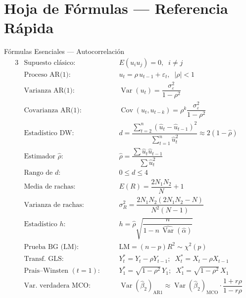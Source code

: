 \documentclass[11pt, letterpaper]{article}
\begin{document}
\newpage

\section*{Hoja de F\'ormulas --- Referencia R\'apida}

\begin{formulabox}{F\'ormulas Esenciales --- Autocorrelaci\'on}
\begin{alignat}{3}
  &\text{Supuesto cl\'asico:}    &\quad&
    E(u_i u_j) = 0,\;\; i\neq j \tag{A1}\\[3pt]
  &\text{Proceso AR(1):}       &\quad&
    u_t = \rho\, u_{t-1} + \varepsilon_t,\;\; |\rho|<1 \tag{A2}\\[3pt]
  &\text{Varianza AR(1):}      &\quad&
    \operatorname{Var}(u_t) = \dfrac{\sigma_\varepsilon^2}{1-\rho^2} \tag{A3}\\[5pt]
  &\text{Covarianza AR(1):}    &\quad&
    \operatorname{Cov}(u_t,u_{t-k}) = \rho^k\dfrac{\sigma_\varepsilon^2}{1-\rho^2} \tag{A4}\\[5pt]
  &\text{Estad\'istico DW:}      &\quad&
    d = \dfrac{\sum_{t=2}^n(\hat u_t-\hat u_{t-1})^2}{\sum_{t=1}^n\hat u_t^2}
      \approx 2(1-\hat\rho) \tag{A5}\\[5pt]
  &\text{Estimador }\hat\rho: &\quad&
    \hat\rho = \dfrac{\sum \hat u_t\hat u_{t-1}}{\sum\hat u_t^2} \tag{A6}\\[5pt]
  &\text{Rango de }d: &\quad&
    0 \leq d \leq 4 \tag{A7}\\[3pt]
  &\text{Media de rachas:}     &\quad&
    E(R) = \dfrac{2N_1 N_2}{N}+1 \tag{A8}\\[5pt]
  &\text{Varianza de rachas:}  &\quad&
    \sigma_R^2 = \dfrac{2N_1 N_2(2N_1 N_2 - N)}{N^2(N-1)} \tag{A9}\\[5pt]
  &\text{Estad\'istico }h: &\quad&
    h = \hat\rho\sqrt{\dfrac{n}{1-n\,\widehat{\operatorname{Var}}(\hat\alpha)}} \tag{A10}\\[5pt]
  &\text{Prueba BG (LM):}      &\quad&
    \mathrm{LM} = (n-p)R^2 \sim \chi^2(p) \tag{A11}\\[3pt]
  &\text{Transf.\ GLS:}  &\quad&
    Y_t^* = Y_t - \rho Y_{t-1};\;\; X_t^* = X_t - \rho X_{t-1} \tag{A12}\\[3pt]
  &\text{Prais--Winsten }(t=1): &\quad&
    Y_1^* = \sqrt{1-\rho^2}\,Y_1;\;\; X_1^* = \sqrt{1-\rho^2}\,X_1 \tag{A13}\\[3pt]
  &\text{Var.\ verdadera MCO:} &\quad&
    \operatorname{Var}(\hat\beta_2)_{\text{AR1}}
    \approx \operatorname{Var}(\hat\beta_2)_{\text{MCO}}
    \cdot\dfrac{1+r\rho}{1-r\rho} \tag{A14}
\end{alignat}
\end{formulabox}
\end{document}
